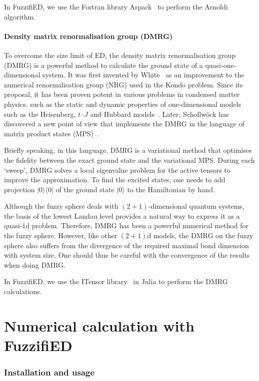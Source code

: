 \documentclass{timesjhep}
\begin{document}
In FuzzifiED, we use the Fortran library Arpack~\cite{Arpack1998} to perform the Arnoldi algorithm.

\subsection{Density matrix renormalisation group (DMRG)}

To overcome the size limit of ED, the density matrix renormalisation group (DMRG) is a powerful method to calculate the ground state of a quasi-one-dimensional system. It was first invented by White~\cite{White1992DMRG} as an improvement to the numerical renormalisation group (NRG) used in the Kondo problem. Since its proposal, it has been proven potent in various problems in condensed matter physics, such as the static and dynamic properties of one-dimensional models such as the Heisenberg, $t$--$J$ and Hubbard models~\cite{Schollwock2005DMRG}. Later, Schollw\"ock has discovered a new point of view that implements the DMRG in the language of matrix product states (MPS)~\cite{Schollwoeck2010DMRG}.

Briefly speaking, in this language, DMRG is a variational method that optimises the fidelity between the exact ground state and the variational MPS. During each `sweep', DMRG solves a local eigenvalue problem for the active tensors to improve the approximation. To find the excited states, one needs to add projection $|0\rangle\langle 0|$ of the ground state $|0\rangle$ to the Hamiltonian by hand.

Although the fuzzy sphere deals with $(2+1)$-dimensional quantum systems, the basis of the lowest Landau level provides a natural way to express it as a quasi-1d problem. Therefore, DMRG has been a powerful numerical method for the fuzzy sphere. However, like other $(2+1)$d models, the DMRG on the fuzzy sphere also suffers from the divergence of the required maximal bond dimension with system size. One should thus be careful with the convergence of the results when doing DMRG.

In FuzzifiED, we use the ITensor library~\cite{ITensor} in Julia to perform the DMRG calculations.

\cleardoublepage
\part{Numerical calculation with FuzzifiED}
\label{pt:numerics}

\section{Installation and usage}
\label{sec:usage}
\end{document}
